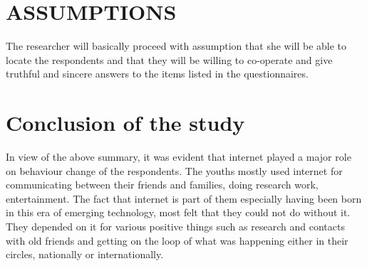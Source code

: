 \documentclass[10pt,letterpaper]{article}
\begin{document}
\section{ASSUMPTIONS }
The researcher will basically proceed with assumption that she will be able to locate the respondents and that they will be willing to co-operate and give truthful and sincere answers to the items listed in the questionnaires. 
\section{Conclusion of the study}
 In view of the above summary, it was evident that internet played a major role on behaviour change of the respondents. The youths mostly used internet for communicating between their friends and families, doing research work, entertainment. The fact that internet is part of them especially having been born in this era of emerging technology, most felt that they could not do without it. They depended on it for various positive things such as research and contacts with old friends and getting on the loop of what was happening either in their circles, nationally or internationally.
\end{document}
